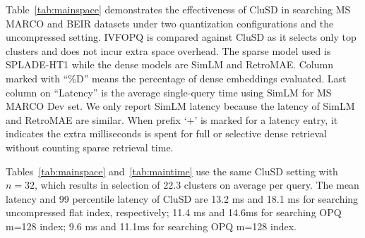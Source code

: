 Table~\ref{tab:mainspace} demonstrates  the effectiveness  of CluSD in searching MS MARCO and BEIR datasets under
two quantization  configurations and the uncompressed setting. 
IVFOPQ is compared against CluSD as it selects only top clusters and does not incur extra space overhead. 
The sparse model used is SPLADE-HT1 while the dense models are SimLM and RetroMAE.
Column marked with  ``\%D'' means the percentage of dense embeddings  evaluated. 
Last column on ``Latency'' is the average single-query time using SimLM for MS MARCO Dev set.  We only report SimLM latency because the latency of SimLM and RetroMAE are similar. 
When 	prefix `+' is marked for a latency entry, it indicates  the extra milliseconds is spent 
for full or selective dense retrieval without counting   sparse retrieval time.

Tables~\ref{tab:mainspace} and~\ref{tab:maintime} use the same CluSD setting with $n=32$, which results in  selection of
22.3 clusters on average per query. 
The mean latency and 99 percentile latency of CluSD are 13.2 ms and 18.1 ms for searching uncompressed flat index, respectively; 
11.4 ms and 14.6ms for searching OPQ m=128 index;  9.6 ms and 11.1ms for searching OPQ m=128 index.

